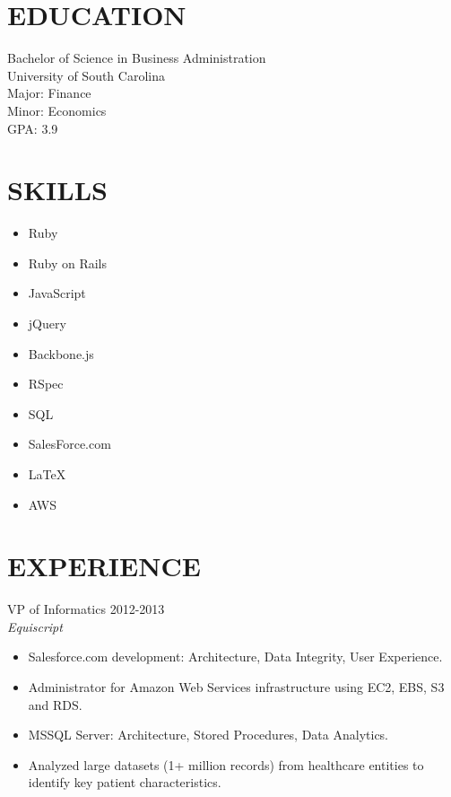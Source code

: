 \documentclass[line, margin]{res}
\begin{document}
\address{San Francisco Bay Area\\ (843) 696-9395\\ drew.kowalik@gmail.com}

\begin{resume}
\section{EDUCATION}
 Bachelor of Science in Business Administration\\
 University of South Carolina\\
 Major: Finance\\
 Minor: Economics\\
 GPA: 3.9
 
\section{SKILLS}
\begin{multicols}{2}
\begin{itemize}[leftmargin=10pt]
\item Ruby
\item Ruby on Rails
\item JavaScript
\item jQuery
\item Backbone.js
\item RSpec
\item SQL
\item SalesForce.com
\item \LaTeX
\item AWS
\end{itemize}
\end{multicols}

\section{EXPERIENCE}
{\large VP of Informatics} \hfill 2012-2013\\
\textit{Equiscript}
\begin{itemize}[leftmargin=10pt]
\item  Salesforce.com development: Architecture, Data Integrity, User Experience. 
\item Administrator for Amazon Web Services infrastructure using EC2, EBS, S3 and RDS.
\item MSSQL Server: Architecture, Stored Procedures, Data Analytics.
\item Analyzed large datasets (1+ million records) from healthcare entities to identify key patient characteristics.
\end{itemize}


\end{resume}
\end{document}
